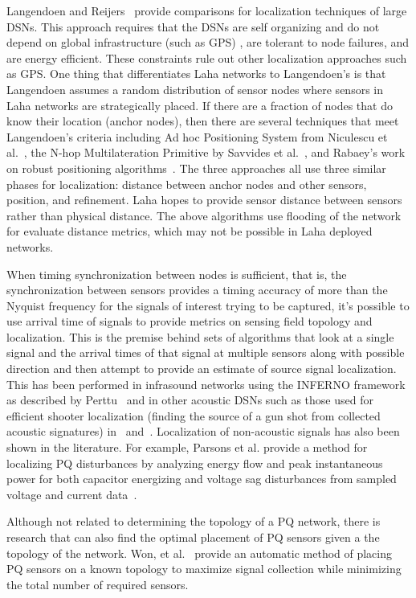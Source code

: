 Langendoen and Reijers~\cite{langendoen2003distributed} provide comparisons for localization techniques of large DSNs. This approach requires that the DSNs are self organizing and do not depend on global infrastructure (such as GPS) , are tolerant to node failures, and are energy efficient. These constraints rule out other localization approaches such as GPS. One thing that differentiates Laha networks to Langendoen's is that Langendoen assumes a random distribution of sensor nodes where sensors in Laha networks are strategically placed. If there are a fraction of nodes that do know their location (anchor nodes), then there are several techniques that meet Langendoen's criteria including Ad hoc Positioning System from Niculescu et al.~\cite{niculescu2003ad}, the N-hop Multilateration Primitive by Savvides et al.~\cite{savvides2002bits}, and Rabaey's work on robust positioning algorithms~\cite{rabaey2002robust}. The three approaches all use three similar phases for localization: distance between anchor nodes and other sensors, position, and refinement. Laha hopes to provide sensor distance between sensors rather than physical distance. The above algorithms use flooding of the network for evaluate distance metrics, which may not be possible in Laha deployed networks.

When timing synchronization between nodes is sufficient, that is, the synchronization between sensors provides a timing accuracy of more than the Nyquist frequency for the signals of interest trying to be captured, it's possible to use arrival time of signals to provide metrics on sensing field topology and localization. This is the premise behind sets of algorithms that look at a single signal and the arrival times of that signal at multiple sensors along with possible direction and then attempt to provide an estimate of source signal localization. This has been performed in infrasound networks using the INFERNO framework as described by Perttu~\cite{perttu2013regional} and in other acoustic DSNs such as those used for efficient shooter localization (finding the source of a gun shot from collected acoustic signatures) in~\cite{gezici2005localization} and~\cite{maroti2004shooter}. Localization of non-acoustic signals has also been shown in the literature. For example, Parsons et al. provide a method for localizing PQ disturbances by analyzing energy flow and peak instantaneous power for both capacitor energizing  and voltage sag disturbances from sampled voltage and current data~\cite{parsons1998direction}.

Although not related to determining the topology of a PQ network, there is research that can also find the optimal placement of PQ sensors given a the topology of the network. Won, et al.~\cite{won2008optimal} provide an automatic method of placing PQ sensors on a known topology to maximize signal collection while minimizing the total number of required sensors.

